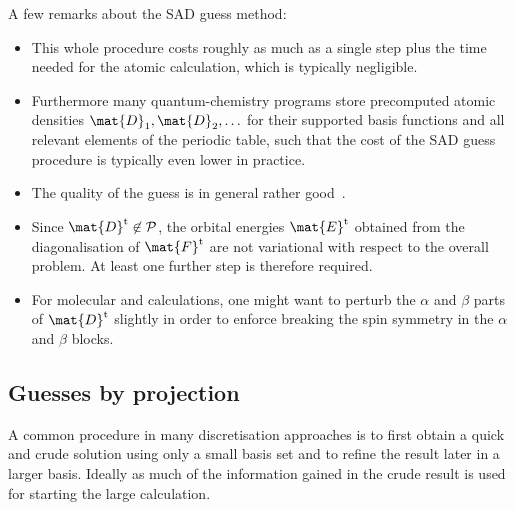 \noindent
A few remarks about the SAD guess method:
\begin{itemize}
	\item 
	This whole procedure costs roughly as much as a single \SCF step
	plus the time needed for the atomic calculation,
	which is typically negligible.
	\item Furthermore many quantum-chemistry programs
		store precomputed atomic densities $\mat{D}_1, \mat{D}_2, \ldots$
		for their supported basis functions
		and all relevant elements of the periodic table,
		such that the cost of the SAD guess procedure
		is typically even lower in practice.
	\item The quality of the guess is in general rather good~\cite{Lenthe2006}.
	\item
	Since $\mat{D}^\text{t} \not\in \mathcal{P}$,
	the orbital energies $\mat{E}^\text{t}$
	obtained from the diagonalisation
	of $\mat{F}^\text{t}$ are not variational with respect to the
	overall \HF problem.
	At least one further \SCF step is therefore required.
	\item For molecular \UHF and \ROHF calculations,
		one might want to perturb the $\alpha$ and $\beta$
		parts of $\mat{D}^\text{t}$ slightly in order to enforce
		breaking the spin symmetry in the $\alpha$ and $\beta$ blocks.
\end{itemize}

\subsection{Guesses by projection}
\label{sec:GuessProject}
A common procedure in many discretisation approaches
is to first obtain a quick and crude solution
using only a small basis set and to refine the result later in a larger basis.
Ideally as much of the information gained in the crude result
is used for starting the large calculation.

